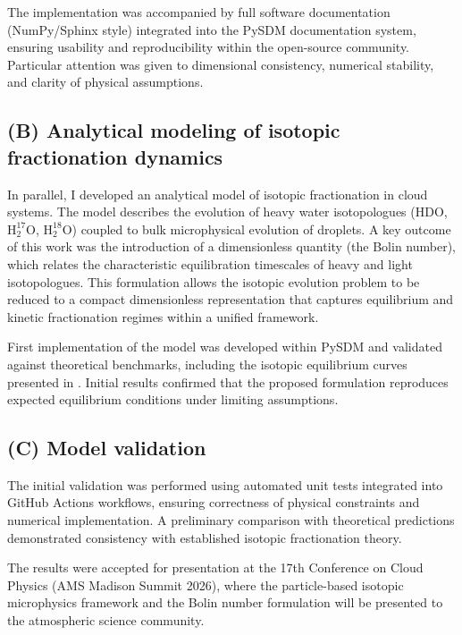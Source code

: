 \documentclass[11pt,a4paper]{article}
\begin{document}
The implementation was accompanied by full software documentation (NumPy/Sphinx style) integrated
into the PySDM documentation system, ensuring usability and reproducibility within the open-source community.
Particular attention was given to dimensional consistency, numerical stability, and clarity of physical assumptions.

\subsection*{(B) Analytical modeling of isotopic fractionation dynamics}
In parallel, I developed an analytical model of isotopic fractionation in cloud systems.
The model describes the evolution of heavy water isotopologues ($\mathrm{HDO}$, $\mathrm{H_2^{17}O}$, $\mathrm{H_2^{18}O}$)
coupled to bulk microphysical evolution of droplets.
A key outcome of this work was the introduction of a dimensionless quantity (the Bolin number),
which relates the {\color{red}characteristic equilibration timescales} of heavy and light isotopologues.
This formulation allows the isotopic evolution problem to be reduced to a compact dimensionless representation
that captures equilibrium and kinetic fractionation regimes within a unified framework.

First implementation of the model was developed within PySDM and validated against theoretical benchmarks,
including the isotopic equilibrium curves presented in \cite{1994_Gedzelman_Arnold}.
Initial results confirmed that the proposed formulation reproduces
expected equilibrium conditions under limiting assumptions.

\subsection*{(C) Model validation}
The initial validation was performed using automated unit tests integrated into GitHub Actions workflows,
ensuring correctness of physical constraints and numerical implementation.
A preliminary comparison with theoretical predictions demonstrated consistency
with established isotopic fractionation theory.

The results were accepted for presentation at the 17th Conference on Cloud Physics 
(AMS Madison Summit 2026),
where the particle-based isotopic microphysics framework and the Bolin number formulation
will be presented to the atmospheric science community.

\end{document}
